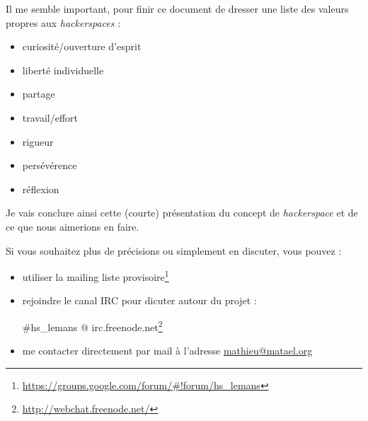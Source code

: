 \documentclass[a4paper, 11pt]{report}
\newcommand{\hs}{{\itshape hackerspace}}
\newcommand{\hsss}{{\itshape hackerspaces}}
\begin{document}
Il me semble important, pour finir ce document de dresser une liste des valeurs propres aux \hsss{} :

\begin{itemize}
    \item curiosité/ouverture d'esprit
    \item liberté individuelle
    \item partage
    \item travail/effort
    \item rigueur
    \item persévérence
    \item réflexion
\end{itemize}

Je vais conclure ainsi cette (courte) présentation du concept de \hs{} et de ce que nous aimerions en faire.

Si vous souhaitez plus de précisions ou simplement en discuter, vous pouvez :

\begin{itemize}
    \item utiliser la mailing liste provisoire\footnote{\url{https://groups.google.com/forum/#!forum/hs_lemans}}
    \item rejoindre le canal IRC pour dicuter autour du projet :
        
        \#hs\_lemans @ irc.freenode.net\footnote{\url{http://webchat.freenode.net/}}
    \item me contacter directement par mail à l'adresse \url{mathieu@matael.org}
\end{itemize}
\end{document}
